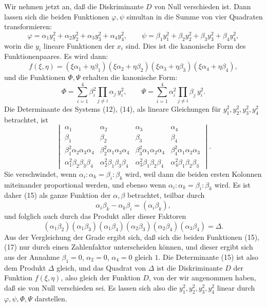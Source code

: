 \documentclass[11pt]{article}
\begin{document}
Wir nehmen jetzt an, daß die Diskriminante $D$ von Null verschieden ist. Dann lassen sich die beiden Funktionen $\varphi,\psi$ simultan in die Summe von vier Quadraten transformieren:
\begin{equation}
\varphi=\alpha_1y_1^2+\alpha_2y_2^2+\alpha_3y_3^2+\alpha_4y_4^2,\qquad
\psi=\beta_1y_1^2+\beta_2y_2^2+\beta_3y_3^2+\beta_4y_4^2,
\tag{12}
\end{equation}
worin die $y_i$ lineare Funktionen der $x_i$ sind. Dies ist die kanonische Form des Funktionenpaares. Es wird dann:
\begin{equation}
f(\xi,\eta)=(\xi\alpha_1+\eta\beta_1)(\xi\alpha_2+\eta\beta_2)(\xi\alpha_3+\eta\beta_3)(\xi\alpha_4+\eta\beta_4),
\tag{13}
\end{equation}
und die Funktionen $\Phi,\Psi$ erhalten die kanonische Form:
\begin{equation}
\Phi=\sum_{i=1}^4 \beta_i^2\!\!\prod_{j\ne i}\alpha_j\,y_i^2,\qquad
\Psi=\sum_{i=1}^4 \alpha_i^2\!\!\prod_{j\ne i}\beta_j\,y_i^2.
\tag{14}
\end{equation}
Die Determinante des Systems (12), (14), als lineare Gleichungen für $y_1^2,y_2^2,y_3^2,y_4^2$ betrachtet, ist
\begin{equation}
\begin{vmatrix}
\alpha_1&\alpha_2&\alpha_3&\alpha_4\\
\beta_1&\beta_2&\beta_3&\beta_4\\
\beta_1^2\alpha_2\alpha_3\alpha_4&
\beta_2^2\alpha_1\alpha_3\alpha_4&
\beta_3^2\alpha_1\alpha_2\alpha_4&
\beta_4^2\alpha_1\alpha_2\alpha_3\\
\alpha_1^2\beta_2\beta_3\beta_4&
\alpha_2^2\beta_1\beta_3\beta_4&
\alpha_3^2\beta_1\beta_2\beta_4&
\alpha_4^2\beta_1\beta_2\beta_3
\end{vmatrix}.
\tag{15}
\end{equation}
Sie verschwindet, wenn $\alpha_i:\alpha_k=\beta_i:\beta_k$ wird, weil dann die beiden ersten Kolonnen miteinander proportional werden, und ebenso wenn $\alpha_i:\alpha_k=\beta_i:\beta_k$ wird. Es ist daher (15) als ganze Funktion der $\alpha,\beta$ betrachtet, teilbar durch
\begin{equation}
\alpha_i\beta_k-\alpha_k\beta_i=(\alpha_i\beta_k),
\tag{16}
\end{equation}
und folglich auch durch das Produkt aller dieser Faktoren
\begin{equation}
(\alpha_1\beta_2)(\alpha_1\beta_3)(\alpha_1\beta_4)(\alpha_2\beta_3)(\alpha_2\beta_4)(\alpha_3\beta_4)=\Delta.
\tag{17}
\end{equation}
Aus der Vergleichung der Grade ergibt sich, daß sich die beiden Funktionen (15), (17) nur durch einen Zahlenfaktor unterscheiden können, und dieser ergibt sich aus der Annahme $\beta_1=0$, $\alpha_2=0$, $\alpha_4=0$ gleich $1$. Die Determinante (15) ist also dem Produkt $\Delta$ gleich, und das Quadrat von $\Delta$ ist die Diskriminante $D$ der Funktion $f(\xi,\eta)$, also gleich der Funktion $D$, von der wir angenommen haben, daß sie von Null verschieden sei. Es lassen sich also die $y_1^2,y_2^2,y_3^2,y_4^2$ linear durch $\varphi,\psi,\Phi,\Psi$ darstellen.
\end{document}
